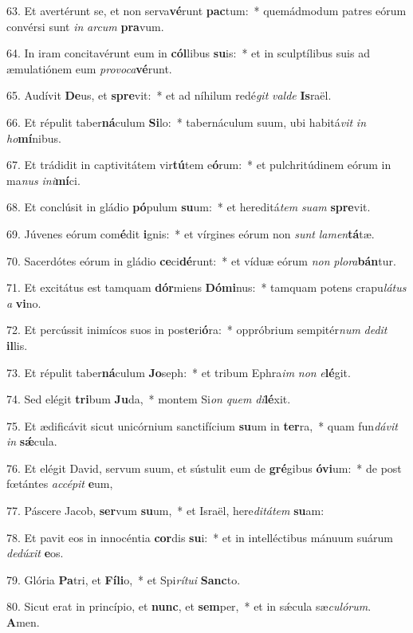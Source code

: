 63. Et avertérunt se, et non serva\textbf{vé}runt \textbf{pac}tum:~*  quemádmodum patres eórum convérsi sunt \textit{in} \textit{ar}\textit{cum} \textbf{pra}vum.\

64. In iram concitavérunt eum in \textbf{cól}libus \textbf{su}is:~*  et in sculptílibus suis ad æmulatiónem eum \textit{pro}\textit{vo}\textit{ca}\textbf{vé}runt.\

65. Audívit \textbf{De}us, et \textbf{spre}vit:~*  et ad níhilum redé\textit{git} \textit{val}\textit{de} \textbf{Is}raël.\

66. Et répulit taber\textbf{ná}culum \textbf{Si}lo:~*  tabernáculum suum, ubi habitá\textit{vit} \textit{in} \textit{ho}\textbf{mí}nibus.\

67. Et trádidit in captivitátem vir\textbf{tú}tem e\textbf{ó}rum:~*  et pulchritúdinem eórum in ma\textit{nus} \textit{in}\textit{i}\textbf{mí}ci.\

68. Et conclúsit in gládio \textbf{pó}pulum \textbf{su}um:~*  et hereditá\textit{tem} \textit{su}\textit{am} \textbf{spre}vit.\

69. Júvenes eórum com\textbf{é}dit \textbf{i}gnis:~*  et vírgines eórum non \textit{sunt} \textit{la}\textit{men}\textbf{tá}tæ.\

70. Sacerdótes eórum in gládio \textbf{ce}ci\textbf{dé}runt:~*  et víduæ eórum \textit{non} \textit{plo}\textit{ra}\textbf{bán}tur.\

71. Et excitátus est tamquam \textbf{dór}miens \textbf{Dó}\textbf{mi}nus:~*  tamquam potens crapu\textit{lá}\textit{tus} \textit{a} \textbf{vi}no.\

72. Et percússit inimícos suos in post\textbf{e}ri\textbf{ó}ra:~*  oppróbrium sempitér\textit{num} \textit{de}\textit{dit} \textbf{il}lis.\

73. Et répulit taber\textbf{ná}culum \textbf{Jo}seph:~*  et tribum Ephra\textit{im} \textit{non} \textit{e}\textbf{lé}git.\

74. Sed elégit \textbf{tri}bum \textbf{Ju}da,~*  montem Si\textit{on} \textit{quem} \textit{di}\textbf{lé}xit.\

75. Et ædificávit sicut unicórnium sanctifícium \textbf{su}um in \textbf{ter}ra,~*  quam fun\textit{dá}\textit{vit} \textit{in} \textbf{sǽ}cula.\

76. Et elégit David, servum suum, et sústulit eum de \textbf{gré}gibus \textbf{ó}\textbf{vi}um:~*  de post fœtántes \textit{ac}\textit{cé}\textit{pit} \textbf{e}um,\

77. Páscere Jacob, \textbf{ser}vum \textbf{su}um,~*  et Israël, here\textit{di}\textit{tá}\textit{tem} \textbf{su}am:\

78. Et pavit eos in innocéntia \textbf{cor}dis \textbf{su}i:~*  et in intelléctibus mánuum suárum \textit{de}\textit{dú}\textit{xit} \textbf{e}os.\

79. Glória \textbf{Pa}tri, et \textbf{Fí}\textbf{li}o,~*  et Spi\textit{rí}\textit{tu}\textit{i} \textbf{Sanc}to.\

80. Sicut erat in princípio, et \textbf{nunc}, et \textbf{sem}per,~*  et in sǽcula sæ\textit{cu}\textit{ló}\textit{rum}. \textbf{A}men.\

